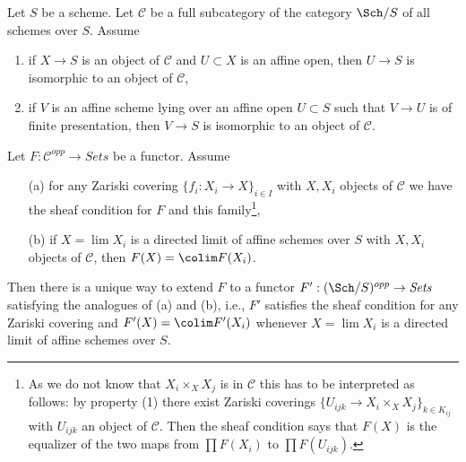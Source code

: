 \begin{lemma}
\label{lemma-extend}
Let $S$ be a scheme. Let $\mathcal{C}$ be a full subcategory
of the category $\Sch/S$ of all schemes over $S$. Assume
\begin{enumerate}
\item if $X \to S$ is an object of $\mathcal{C}$ and
$U \subset X$ is an affine open, then $U \to S$ is isomorphic
to an object of $\mathcal{C}$,
\item if $V$ is an affine scheme lying over an affine open $U \subset S$
such that $V \to U$ is of finite presentation, then $V \to S$ is isomorphic
to an object of $\mathcal{C}$.
\end{enumerate}
Let $F : \mathcal{C}^{opp} \to \textit{Sets}$ be a functor.
Assume
\begin{enumerate}
\item[(a)] for any Zariski covering $\{f_i : X_i \to X\}_{i \in I}$
with $X, X_i$ objects of $\mathcal{C}$ we have
the sheaf condition for $F$ and this family\footnote{As we
do not know that $X_i \times_X X_j$ is in $\mathcal{C}$
this has to be interpreted as follows: by property (1)
there exist Zariski coverings $\{U_{ijk} \to X_i \times_X X_j\}_{k \in K_{ij}}$
with $U_{ijk}$ an object of $\mathcal{C}$. Then the sheaf condition
says that $F(X)$ is the equalizer of the two maps
from $\prod F(X_i)$ to $\prod F(U_{ijk})$.},
\item[(b)] if $X = \lim X_i$ is a directed limit of affine schemes
over $S$ with $X, X_i$ objects of $\mathcal{C}$, then
$F(X) = \colim F(X_i)$.
\end{enumerate}
Then there is a unique way to extend $F$ to a functor
$F' : (\Sch/S)^{opp} \to \textit{Sets}$ satisfying the analogues of
(a) and (b), i.e., $F'$ satisfies the sheaf condition for any
Zariski covering and $F'(X) = \colim F'(X_i)$ whenever $X = \lim X_i$
is a directed limit of affine schemes over $S$.
\end{lemma}

